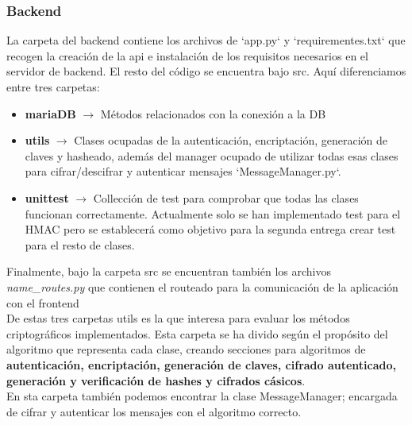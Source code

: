 \documentclass[a4paper,11pt]{article}
\begin{document}
\subsubsection{Backend}
La carpeta del backend contiene los archivos de `app.py` y `requirementes.txt` que recogen la creación de la api e instalación de los requisitos necesarios en el servidor de backend. El resto del código se encuentra bajo src. Aquí diferenciamos entre tres carpetas:
\begin{itemize}
\item \textbf{mariaDB} $\rightarrow$ Métodos relacionados con la conexión a la DB

\item \textbf{utils} $\rightarrow$ Clases ocupadas de la autenticación, encriptación, generación de claves y hasheado, además del manager ocupado de utilizar todas esas clases para cifrar/descifrar y autenticar mensajes `MessageManager.py`.

\item \textbf{unittest} $\rightarrow$ Collección de test para comprobar que
    todas las clases funcionan correctamente. Actualmente solo se han
    implementado test para el HMAC pero se establecerá como objetivo para la
    segunda entrega crear test para el resto de clases.
\end{itemize}

Finalmente, bajo la carpeta src se encuentran también los archivos
\textit{name\_routes.py} que contienen el routeado para la comunicación de la aplicación
con el frontend\\

De estas tres carpetas utils es la que interesa para evaluar los métodos
criptográficos implementados. Esta carpeta se ha divido según el propósito del
algoritmo que representa cada clase, creando secciones para algoritmos de
\textbf{autenticación, encriptación, generación de claves, cifrado autenticado, generación y verificación de hashes y
cifrados cásicos}. \\
En sta carpeta también podemos encontrar la clase MessageManager; encargada de cifrar y
autenticar los mensajes con el algoritmo correcto.\\\\

\end{document}
